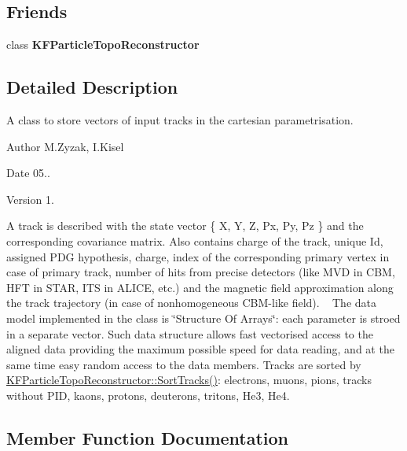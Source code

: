 \subsection*{Friends}
\begin{DoxyCompactItemize}
\item 
class {\bfseries K\+F\+Particle\+Topo\+Reconstructor}\hypertarget{classKFPTrackVector_a0e6185ea990fc0e2b0ff37af4376c4c6}{}\label{classKFPTrackVector_a0e6185ea990fc0e2b0ff37af4376c4c6}

\end{DoxyCompactItemize}


\subsection{Detailed Description}
A class to store vectors of input tracks in the cartesian parametrisation. 

\begin{DoxyAuthor}{Author}
M.\+Zyzak, I.\+Kisel 
\end{DoxyAuthor}
\begin{DoxyDate}{Date}
05.. 
\end{DoxyDate}
\begin{DoxyVersion}{Version}
1.
\end{DoxyVersion}
A track is described with the state vector \{ X, Y, Z, Px, Py, Pz \} and the corresponding covariance matrix. Also contains charge of the track, unique Id, assigned P\+DG hypothesis, charge, index of the corresponding primary vertex in case of primary track, number of hits from precise detectors (like M\+VD in C\+BM, H\+FT in S\+T\+AR, I\+TS in A\+L\+I\+CE, etc.) and the magnetic field approximation along the track trajectory (in case of nonhomogeneous C\+B\+M-\/like field). ~\newline
The data model implemented in the class is \char`\"{}\+Structure Of Arrays\char`\"{}\+: each parameter is stroed in a separate vector. Such data structure allows fast vectorised access to the aligned data providing the maximum possible speed for data reading, and at the same time easy random access to the data members. Tracks are sorted by \hyperlink{classKFParticleTopoReconstructor_a35f6755e97c39e1e00373272d1546f36}{K\+F\+Particle\+Topo\+Reconstructor\+::\+Sort\+Tracks()}\+: electrons, muons, pions, tracks without P\+ID, kaons, protons, deuterons, tritons, He3, He4. 

\subsection{Member Function Documentation}
